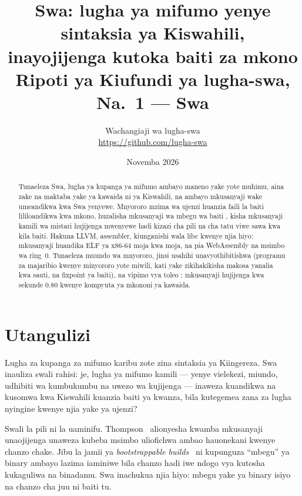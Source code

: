 \documentclass[11pt,a4paper]{article}
\title{\textbf{Swa: lugha ya mifumo yenye sintaksia ya Kiswahili,\\inayojijenga kutoka baiti \KwanzaBaiti{} za mkono}\\[0.5em]
\large Ripoti ya Kiufundi ya lugha-swa, Na.~1 --- Swa \Toleo}
\author{Wachangiaji wa lugha-swa\\\small\url{https://github.com/lugha-swa}}
\date{Novemba 2026}
\begin{document}
\maketitle

\begin{abstract}
\noindent Tunaeleza Swa, lugha ya kupanga ya mifumo ambayo maneno yake yote muhimu, aina zake na maktaba yake ya kawaida ni ya Kiswahili, na ambayo mkusanyaji wake umeandikwa kwa Swa yenyewe. Mnyororo mzima wa ujenzi huanzia faili la baiti \KwanzaBaiti{} lililoandikwa kwa mkono, huzalisha mkusanyaji wa mbegu wa baiti \MbeguBaiti, kisha mkusanyaji kamili wa mistari \MkusanyajiMistari{} hujijenga mwenyewe hadi kizazi cha pili na cha tatu viwe sawa kwa kila baiti. Hakuna LLVM, assembler, kiunganishi wala libc kwenye njia hiyo: mkusanyaji huandika ELF ya x86-64 moja kwa moja, na pia WebAssembly na msimbo wa ring~0. Tunaeleza muundo wa mnyororo, jinsi usahihi unavyothibitishwa (programu \MajaribioProgramu{} za majaribio kwenye minyororo yote miwili, \MajaribioKata{} kati yake zikihakikisha makosa yanalia kwa sauti, na fixpoint ya baiti), na vipimo vya toleo \Toleo: mkusanyaji hujijenga kwa sekunde 0.80 kwenye kompyuta ya mkononi ya kawaida.
\end{abstract}

\section{Utangulizi}

Lugha za kupanga za mifumo karibu zote zina sintaksia ya Kiingereza. Swa inauliza swali rahisi: je, lugha ya mifumo kamili --- yenye vielekezi, miundo, udhibiti wa kumbukumbu na uwezo wa kujijenga --- inaweza kuandikwa na kusomwa kwa Kiswahili kuanzia baiti ya kwanza, bila kutegemea zana za lugha nyingine kwenye njia yake ya ujenzi?

Swali la pili ni la uaminifu. Thompson~\cite{thompson1984} alionyesha kwamba mkusanyaji unaojijenga unaweza kubeba msimbo uliofichwa ambao hauonekani kwenye chanzo chake. Jibu la jamii ya \emph{bootstrappable builds}~\cite{bootstrappable} ni kupunguza ``mbegu'' ya binary ambayo lazima iaminiwe bila chanzo hadi iwe ndogo vya kutosha kukaguliwa na binadamu. Swa inachukua njia hiyo: mbegu yake ya binary isiyo na chanzo cha juu ni baiti \KwanzaBaiti{} tu.
\end{document}
